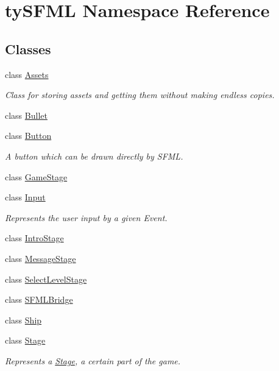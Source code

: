 \hypertarget{namespacety_s_f_m_l}{}\section{ty\+S\+F\+M\+L Namespace Reference}
\label{namespacety_s_f_m_l}
\subsection*{Classes}
\begin{DoxyCompactItemize}
\item 
class \hyperlink{classty_s_f_m_l_1_1_assets}{Assets}
\begin{DoxyCompactList}\small\item\em Class for storing assets and getting them without making endless copies. \end{DoxyCompactList}\item 
class \hyperlink{classty_s_f_m_l_1_1_bullet}{Bullet}
\item 
class \hyperlink{classty_s_f_m_l_1_1_button}{Button}
\begin{DoxyCompactList}\small\item\em A button which can be drawn directly by S\+F\+M\+L. \end{DoxyCompactList}\item 
class \hyperlink{classty_s_f_m_l_1_1_game_stage}{Game\+Stage}
\item 
class \hyperlink{classty_s_f_m_l_1_1_input}{Input}
\begin{DoxyCompactList}\small\item\em Represents the user input by a given Event. \end{DoxyCompactList}\item 
class \hyperlink{classty_s_f_m_l_1_1_intro_stage}{Intro\+Stage}
\item 
class \hyperlink{classty_s_f_m_l_1_1_message_stage}{Message\+Stage}
\item 
class \hyperlink{classty_s_f_m_l_1_1_select_level_stage}{Select\+Level\+Stage}
\item 
class \hyperlink{classty_s_f_m_l_1_1_s_f_m_l_bridge}{S\+F\+M\+L\+Bridge}
\item 
class \hyperlink{classty_s_f_m_l_1_1_ship}{Ship}
\item 
class \hyperlink{classty_s_f_m_l_1_1_stage}{Stage}
\begin{DoxyCompactList}\small\item\em Represents a \hyperlink{classty_s_f_m_l_1_1_stage}{Stage}, a certain part of the game. \end{DoxyCompactList}\item 

\end{DoxyCompactItemize}
